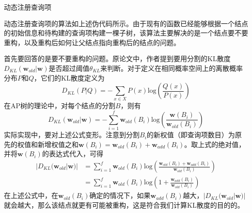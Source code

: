 \documentclass[UTF8]{ctexart}
\begin{document}
\begin{spacing}{1.0}
\begin{algorithm}[H]
\caption{动态注册查询项}
\LinesNumbered
{}
\end{algorithm}
\end{spacing}

动态注册查询项的算法如上述伪代码所示。由于现有的函数已经能够根据一个结点的初始信息和待构建的查询项构建一棵子树，该算法主要解决的是一个结点要不要重构，以及重构后如何让父结点指向重构后的结点的问题。

首先要回答的是要不要重构的问题。原论文中，作者提到要用分割的KL散度$D_{KL}(\textbf{w}_{old}|\textbf{w})$是否超过阈值$\theta_{KL}$来判断。对于定义在相同概率空间上的离散概率分布$P$和$Q$，它们的KL散度定义为
\[D_{KL}(P|Q)=-\sum_{x\in X} P(x)\mathrm{log}(\frac{Q(x)}{P(x)})\]
在AP树的理论中，对每个结点的分割$B$，则有
\[D_{KL}(\textbf{w}_{old}|\textbf{w})=-\sum_{i=1}^f \textbf{w}_{old}(B_i) \mathrm{log}(\frac{\textbf{w}(B_i)}{\textbf{w}_{old}(B_i)})\]
实际实现中，要对上述公式变形。注意到分割$B_i$的新权值（即查询项数目）为原先的权值和新增权值之和$\textbf{w}(B_i)=\textbf{w}_{old}(B_i)+\textbf{w}_{add}(B_i)$。取上式的绝对值，并将$\textbf{w}(B_i)$的表达式代入，可得 
\[\begin{split}|D_{KL}(\textbf{w}_{old}|\textbf{w})| 
&= \sum_{i=1}^f \textbf{w}_{old}(B_i) \mathrm{log}(\frac{\textbf{w}_{old}(B_i) + \textbf{w}_{add}(B_i)}{\textbf{w}_{old}(B_i)}) \\
&= \sum_{i=1}^f \textbf{w}_{old}(B_i)\mathrm{log}(1 + \frac{\textbf{w}_{add}(B_i)}{\textbf{w}_{old}(B_i)}) \end{split}\] 
在上述公式中，在$\textbf{w}_{old}(B_i)$确定的情况下，如果$\textbf{w}_{add}(B_i)$越大，$|D_{KL}(\textbf{w}_{old}|\textbf{w})|$就会越大，那么该结点就更有可能被重构，这是符合我们计算KL散度的目的的。
\end{document}
